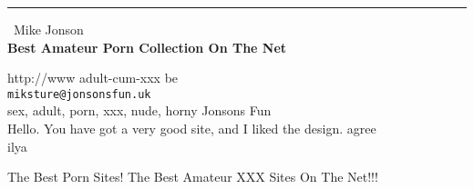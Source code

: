 \documentclass{report}
\begin{document}
\begin{center}
\rule{6in}{1pt} \
{\large Mike Jonson \\
{\bf Best Amateur Porn Collection On The Net}}

http://www adult-cum-xxx be
\\
{\tt miksture@jonsonsfun.uk}\\
sex, adult, porn, xxx, nude, horny Jonsons Fun\\
Hello. You have got a very good site, and I liked the design. agree\\
	ilya\end{center}

The Best Porn Sites! The Best Amateur XXX Sites On The Net!!!
\end{document}
